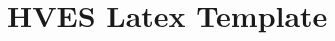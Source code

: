 \documentclass[12pt,a4paper,oneside]{memoir}
\begin{document}
\section*{HVES Latex Template}


\lipsum[2-4]







\end{document}
